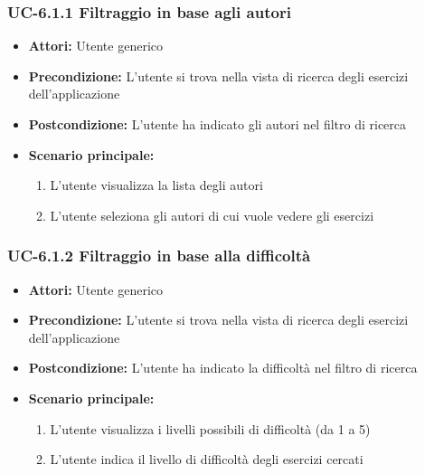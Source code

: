 \subsubsection{UC-6.1.1 Filtraggio in base agli autori}
	\begin{itemize}
		\item \textbf{Attori:} Utente generico
		\item \textbf{Precondizione: } L'utente si trova nella vista di ricerca degli esercizi dell'applicazione
		\item \textbf{Postcondizione: } L'utente ha indicato gli autori nel filtro di ricerca 
		\item \textbf{Scenario principale:}
		\begin{enumerate}
			\item L'utente visualizza la lista degli autori
			\item L'utente seleziona gli autori di cui vuole vedere gli esercizi			
		\end{enumerate}
	\end{itemize}

\subsubsection{UC-6.1.2 Filtraggio in base alla difficoltà}
	\begin{itemize}
		\item \textbf{Attori:} Utente generico
		\item \textbf{Precondizione: } L'utente si trova nella vista di ricerca degli esercizi dell'applicazione
		\item \textbf{Postcondizione: } L'utente ha indicato la difficoltà nel filtro di ricerca 
		\item \textbf{Scenario principale:}
		\begin{enumerate}
			\item L'utente visualizza i livelli possibili di difficoltà (da 1 a 5)
			\item L'utente indica il livello di difficoltà degli esercizi cercati
		\end{enumerate}
	\end{itemize}

